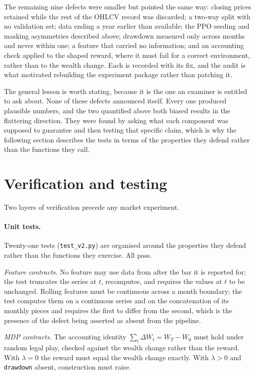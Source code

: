 The remaining nine defects were smaller but pointed the same way: closing
prices retained while the rest of the OHLCV record was discarded; a two-way
split with no validation set; data ending a year earlier than available; the
PPO seeding and masking asymmetries described above; drawdown measured only
across months and never within one; a feature that carried no information;
and an accounting check applied to the shaped reward, where it must fail for
a correct environment, rather than to the wealth change. Each is recorded
with its fix, and the audit is what motivated rebuilding the experiment
package rather than patching it.

The general lesson is worth stating, because it is the one an examiner is
entitled to ask about. None of these defects announced itself. Every one
produced plausible numbers, and the two quantified above both biased results
in the flattering direction. They were found by asking what each component
was supposed to guarantee and then testing that specific claim, which is
why the following section describes the tests in terms of the properties
they defend rather than the functions they call.

\section{Verification and testing}
\label{sec:testing}

Two layers of verification precede any market experiment.

\paragraph{Unit tests.} Twenty-one tests (\texttt{test\_v2.py}) are
organised around the properties they defend rather than the functions they
exercise. All pass.

\emph{Feature contracts.} No feature may use data from after the bar it is
reported for; the test truncates the series at $t$, recomputes, and requires
the values at $t$ to be unchanged. Rolling features must be continuous
across a month boundary; the test computes them on a continuous series and
on the concatenation of its monthly pieces and requires the first to differ
from the second, which is the presence of the defect being asserted as
absent from the pipeline.

\emph{MDP contracts.} The accounting identity
$\sum_t \Delta W_t = W_T - W_0$ must hold under random legal play, checked
against the wealth change rather than the reward. With $\lambda = 0$ the
reward must equal the wealth change exactly. With $\lambda > 0$ and
\texttt{drawdown} absent, construction must raise.

